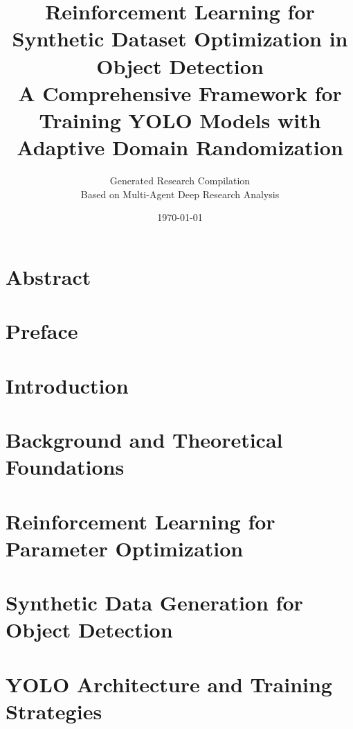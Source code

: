 \documentclass[11pt,twoside,openany]{book}
\title{
  \vspace{-2cm}
  {\Huge\bfseries Reinforcement Learning for Synthetic Dataset Optimization in Object Detection} \\[1cm]
  {\Large A Comprehensive Framework for Training YOLO Models with Adaptive Domain Randomization} \\[2cm]
}
\author{
  \Large Generated Research Compilation \\[0.5cm]
  \large Based on Multi-Agent Deep Research Analysis
}
\date{\today}
\theoremstyle{definition}
\theoremstyle{plain}
\theoremstyle{remark}
\begin{document}
\frontmatter
\maketitle

\setcounter{tocdepth}{1}
\tableofcontents
\listofalgorithms

\chapter*{Abstract}


\chapter*{Preface}


\mainmatter

\chapter{Introduction}
\label{ch:introduction}


\chapter{Background and Theoretical Foundations}
\label{ch:background}


\chapter{Reinforcement Learning for Parameter Optimization}
\label{ch:rl_algorithms}


\chapter{Synthetic Data Generation for Object Detection}
\label{ch:synthetic_data}


\chapter{YOLO Architecture and Training Strategies}
\label{ch:yolo_training}

\end{document}
